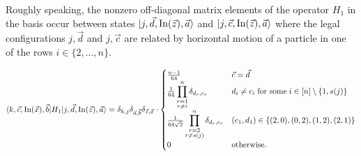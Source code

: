 \documentclass[../thesis-main/thesis-main]{subfiles}
\begin{document}
Roughly speaking, the nonzero off-diagonal matrix elements of the operator $H_{1}$ in the basis  occur between states $|j,\vec{d},\operatorname{In}(\vec{z}),\vec{a}\rangle$ and $|j,\vec{c},\operatorname{In}(\vec{z}),\vec{a}\rangle$ where the legal configurations $j,\vec{d}$ and $j,\vec{c}$ are related by horizontal motion of a particle in one of the rows $i\in\{2,\ldots,n\}$. 

\begin{mdframed}[frametitle=Matrix elements of $H_{1}$]
\begin{equation}
\langle k,\vec{c},\operatorname{In}(\vec{x}),\vec{b}|H_{1}|j,\vec{d},\operatorname{In}(\vec{z}),\vec{a}\rangle=\delta_{k,j}\delta_{\vec{a},\vec{b}}\delta_{\vec{z},\vec{x}}\cdot\begin{cases}
\frac{n-1}{64} & \vec{c}=\vec{d}\\
\frac{1}{64}\displaystyle\prod_{\substack{r=1\\r\neq i}}^n
\delta_{d_{r},c_{r}} & d_{i}\neq c_{i}\;\text{for some}\; i\in[n]\setminus\{1,s(j)\}\\
\frac{1}{64\sqrt{2}} \displaystyle\prod_{\substack{r=2\\r\neq s(j)}}^n \delta_{d_{r},c_{r}} & (c_{1},d_{1})\in\{(2,0),(0,2),(1,2),(2,1)\}\\
0 & \text{otherwise.}
\end{cases}\label{eq:H1_goodbasis-1}
\end{equation}
\end{mdframed}
\end{document}
